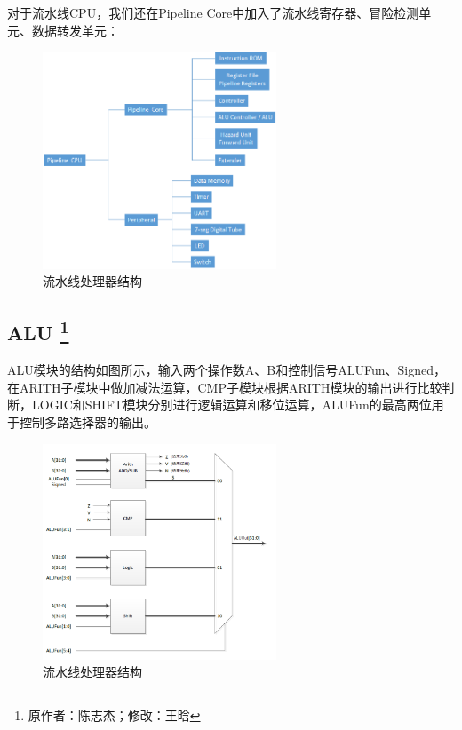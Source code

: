 \documentclass{article}
\begin{document}
            对于流水线CPU，我们还在Pipeline Core中加入了流水线寄存器、冒险检测单元、数据转发单元：
            \begin{figure}[H]
                    \centering
                    \includegraphics[width=0.62\textwidth]{images/pipeline.png}
                    \caption{\label{fig:pipeline}流水线处理器结构}
                \end{figure}
            
        \subsection{ALU \protect\footnote{原作者：陈志杰；修改：王晗}}
            ALU模块的结构如图所示，输入两个操作数A、B和控制信号ALUFun、Signed，在ARITH子模块中做加减法运算，CMP子模块根据ARITH模块的输出进行比较判断，LOGIC和SHIFT模块分别进行逻辑运算和移位运算，ALUFun的最高两位用于控制多路选择器的输出。
            \begin{figure}[H]
                    \centering
                    \includegraphics[width=0.62\textwidth]{images/ALU.png}
                    \caption{\label{fig:ALU}流水线处理器结构}
                \end{figure}
            
\end{document}
